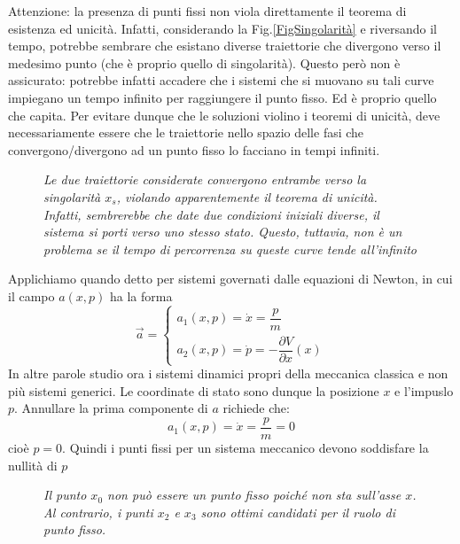 \documentclass[a4paper,openany]{article}
\begin{document}
	Attenzione: la presenza di punti fissi non viola direttamente il teorema di esistenza ed unicità. Infatti, considerando la Fig.\ref{FigSingolarità} e riversando il tempo, potrebbe sembrare che esistano diverse traiettorie che divergono verso il medesimo punto (che è proprio quello di singolarità). Questo però non è assicurato: potrebbe infatti accadere che i sistemi che si muovano su tali curve impiegano un tempo infinito per raggiungere il punto fisso. Ed è proprio quello che capita. Per evitare dunque che le soluzioni violino i teoremi di unicità, deve necessariamente essere che le traiettorie nello spazio delle fasi che convergono/divergono ad un punto fisso lo facciano in tempi infiniti.
	\begin{figure}[H]
		\centering
		\caption{\textit{Le due traiettorie considerate convergono entrambe verso la singolarità $x_{s}$, violando apparentemente il teorema di unicità. Infatti, sembrerebbe che date due condizioni iniziali diverse, il sistema si porti verso uno stesso stato. Questo, tuttavia, non è un problema se il tempo di percorrenza su queste curve tende all'infinito}}
	\end{figure}
	Applichiamo quando detto per sistemi governati dalle equazioni di Newton, in cui il campo $a(x,p)$ ha la forma 
	\begin{equation}
		\vec{a} =
		\begin{cases}
			a_{1}(x,p) = \dot{x} = \dfrac{p}{m} \\
			a_{2}(x,p) = \dot{p} = -\dfrac{\partial V}{\partial x}(x)
		\end{cases}
		\label{NewtonField}
	\end{equation}
	In altre parole studio ora i sistemi dinamici propri della meccanica classica e non più sistemi generici. Le coordinate di stato sono dunque la posizione $x$ e l'impuslo $p$. Annullare la prima componente di $a$ richiede che:
	$$
	a_{1}(x,p) = \dot{x} = \dfrac{p}{m} = 0 
	$$
	cioè $p=0$. Quindi i punti fissi per un sistema meccanico devono soddisfare la nullità di $p$
	\begin{figure}[H]
		\centering
		\caption{\textit{Il punto $x_{0}$ non può essere un punto fisso poiché non sta sull'asse $x$. Al contrario, i punti $x_{2}$ e $x_{3}$ sono ottimi candidati per il ruolo di punto fisso.}}
		
	\end{figure}
\end{document}
